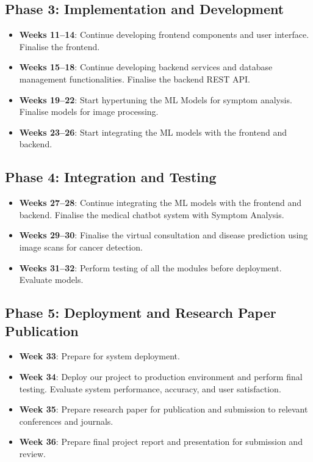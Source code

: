 \documentclass[onecolumn]{article}
\begin{document}
\subsection{Phase 3: Implementation and Development}

\begin{itemize}
\item \textbf{Weeks 11–14}: Continue developing frontend components and user interface. Finalise the frontend.
\item \textbf{Weeks 15–18}: Continue developing backend services and database management functionalities. Finalise the backend REST API.\
\item \textbf{Weeks 19–22}: Start hypertuning the ML Models for symptom analysis. Finalise models for image processing.
\item \textbf{Weeks 23–26}: Start integrating the ML models with the frontend and backend.
\end{itemize}

\subsection{Phase 4: Integration and Testing}
\begin{itemize}
\item \textbf{Weeks 27–28}: Continue integrating the ML models with the frontend and backend. Finalise the medical chatbot system with Symptom Analysis.
\item \textbf{Weeks 29–30}: Finalise the virtual consultation and disease prediction using image scans for cancer detection.
\item \textbf{Weeks 31–32}: Perform testing of all the modules before deployment. Evaluate models.
\end{itemize}

\subsection{Phase 5: Deployment and Research Paper Publication}
\begin{itemize}
\item \textbf{Week 33}: Prepare for system deployment.
\item \textbf{Week 34}: Deploy our project to production environment and perform final testing. Evaluate system performance, accuracy, and user satisfaction.
\item \textbf{Week 35}: Prepare research paper for publication and submission to relevant conferences and journals.
\item \textbf{Week 36}: Prepare final project report and presentation for submission and review.
\end{itemize}
\end{document}
